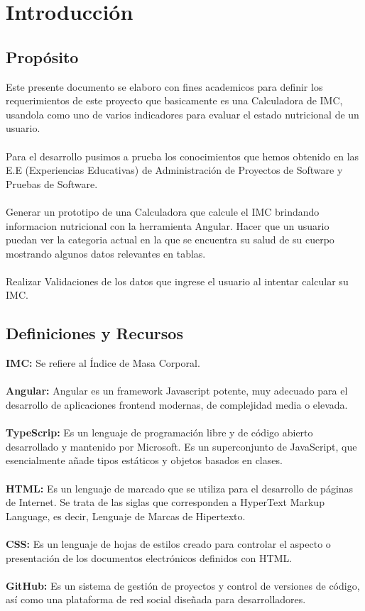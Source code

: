 \documentclass[80pt]{article}
\begin{document}
\tableofcontents
\newpage

\section{Introducción}

\subsection{Propósito}
\vspace{0.5 cm}
Este presente documento se elaboro con fines academicos para definir los requerimientos de este proyecto que basicamente es una Calculadora de IMC, usandola como uno de varios indicadores para evaluar el estado nutricional de un usuario.\\\\
Para el desarrollo pusimos a prueba los conocimientos que hemos obtenido en las E.E (Experiencias Educativas) de Administración de Proyectos de Software y Pruebas de Software.\\\\
Generar un prototipo de una Calculadora que calcule el IMC brindando informacion nutricional con la herramienta Angular.
Hacer que un usuario puedan ver la categoria actual en la que se encuentra su salud de su cuerpo mostrando algunos datos relevantes en tablas.\\\\
Realizar Validaciones de los datos que ingrese el usuario al intentar calcular su IMC.

\subsection{Definiciones y Recursos}
\vspace{0.5 cm}
\textbf {IMC:} Se refiere al Índice de Masa Corporal.\\\\
\textbf {Angular:} Angular es un framework Javascript potente, muy adecuado para el desarrollo de aplicaciones frontend modernas, de complejidad media o elevada.\\\\
\textbf {TypeScrip:} Es un lenguaje de programación libre y de código abierto desarrollado y mantenido por Microsoft. Es un superconjunto de JavaScript, que esencialmente añade tipos estáticos y objetos basados en clases.\\\\
\textbf {HTML:} Es un lenguaje de marcado que se utiliza para el desarrollo de páginas de Internet. Se trata de las siglas que corresponden a HyperText Markup Language, es decir, Lenguaje de Marcas de Hipertexto.\\\\
\textbf {CSS:} Es un lenguaje de hojas de estilos creado para controlar el aspecto o presentación de los documentos electrónicos definidos con HTML.\\\\
\textbf {GitHub:} Es un sistema de gestión de proyectos y control de versiones de código, así como una plataforma de red social diseñada para desarrolladores.
\end{document}
